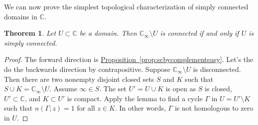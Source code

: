 \documentclass[12pt,openany]{book}
\newcommand{\C}{{\mathbb{C}}}
\theoremstyle{plain}
\newtheorem{thm}{Theorem}[section]
\theoremstyle{remark}
\theoremstyle{definition}
\theoremstyle{exercise}
\theoremstyle{example}
\newcommand{\propref}[1]{\hyperref[#1]{Proposition~\ref*{#1}}}
\begin{document}
We can now prove the simplest
topological characterization of simply connected domains in $\C$.

\begin{thm} \label{cor:scbycomplementhard}
Let $U \subset \C$ be a domain.  Then
$\C_\infty \setminus U$ is connected if and only if $U$ is simply connected.
\end{thm}

\begin{proof}
The forward direction is \propref{prop:scbycomplementeasy}.  Let's the do
the backwards direction by contrapositive.  Suppose $\C_\infty
\setminus U$ is disconnected.  Then there are two nonempty disjoint closed
sets $S$ and $K$ such that $S \cup K = \C_\infty \setminus U$. 
Assume $\infty \in S$.
The set $U' = U \cup K$ is open as $S$ is closed, $U' \subset \C$,
and $K \subset U'$ is compact.  Apply the lemma to find a cycle
$\Gamma$ in $U = U' \setminus K$ such that $n(\Gamma;z) = 1$ for all $z \in
K$.  In other words, $\Gamma$ is not homologous to zero in $U$.
\end{proof}
\end{document}
